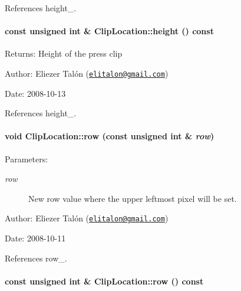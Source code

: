 References height\_\-.\hypertarget{class_clip_location_e18ec2c31e76a983acdbaec9d3bad659}{
\paragraph[{height}]{\setlength{\rightskip}{0pt plus 5cm}const unsigned int \& ClipLocation::height () const}\hfill}
\label{class_clip_location_e18ec2c31e76a983acdbaec9d3bad659}


\begin{Desc}
\item[Returns:]Height of the press clip\end{Desc}
\begin{Desc}
\item[Author:]Eliezer Talón (\href{mailto:elitalon@gmail.com}{\tt elitalon@gmail.com}) \end{Desc}
\begin{Desc}
\item[Date:]2008-10-13 \end{Desc}


References height\_\-.\hypertarget{class_clip_location_5a95f9fae24adf0b6d227714b9b69e2e}{
\paragraph[{row}]{\setlength{\rightskip}{0pt plus 5cm}void ClipLocation::row (const unsigned int \& {\em row})}\hfill}
\label{class_clip_location_5a95f9fae24adf0b6d227714b9b69e2e}


\begin{Desc}
\item[Parameters:]
\begin{description}
\item[{\em row}]New row value where the upper leftmost pixel will be set.\end{description}
\end{Desc}
\begin{Desc}
\item[Author:]Eliezer Talón (\href{mailto:elitalon@gmail.com}{\tt elitalon@gmail.com}) \end{Desc}
\begin{Desc}
\item[Date:]2008-10-11 \end{Desc}


References row\_\-.\hypertarget{class_clip_location_8816c925e80c2e55bbbbdd6da799f53f}{
\paragraph[{row}]{\setlength{\rightskip}{0pt plus 5cm}const unsigned int \& ClipLocation::row () const}\hfill}
\label{class_clip_location_8816c925e80c2e55bbbbdd6da799f53f}


